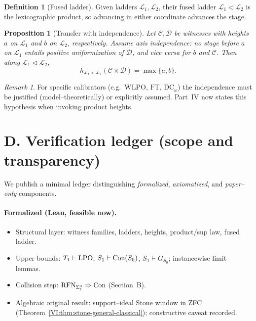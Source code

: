 \documentclass[11pt]{article}
\newtheorem{proposition}[theorem]{Proposition}
\theoremstyle{definition}
\newtheorem{definition}[theorem]{Definition}
\theoremstyle{remark}
\newtheorem{remark}[theorem]{Remark}
\newcommand{\WLPO}{\mathrm{WLPO}}
\newcommand{\DCw}{\mathrm{DC}_\omega}
\newcommand{\FT}{\mathrm{FT}}
\begin{document}
\begin{definition}[Fused ladder]
Given ladders $\mathcal L_1,\mathcal L_2$, their fused ladder $\mathcal L_1\triangleleft\mathcal L_2$ is the lexicographic product, so advancing in either coordinate advances the stage.
\end{definition}

\begin{proposition}[Transfer with independence]\label{VI:prop:transfer-indep}
Let $\mathcal C,\mathcal D$ be witnesses with heights $a$ on $\mathcal L_1$ and $b$ on $\mathcal L_2$, respectively. Assume \emph{axis independence}: no stage before $a$ on $\mathcal L_1$ entails positive uniformization of $\mathcal D$, and vice versa for $b$ and $\mathcal C$. Then along $\mathcal L_1\triangleleft\mathcal L_2$,
\[
h_{\mathcal L_1\triangleleft\mathcal L_2}(\mathcal C\times \mathcal D)=\max\{a,b\}.
\]
\end{proposition}

\begin{remark}
For specific calibrators (e.g.\ $\WLPO$, $\FT$, $\DCw$) the independence must be justified (model–theoretically) or explicitly assumed. Part~IV now states this hypothesis when invoking product heights.
\end{remark}

\section{D. Verification ledger (scope and transparency)}

We publish a minimal ledger distinguishing \emph{formalized}, \emph{axiomatized}, and \emph{paper–only} components.

\paragraph{Formalized (Lean, feasible now).}
\begin{itemize}
\item Structural layer: witness families, ladders, heights, product/sup law, fused ladder.
\item Upper bounds: $T_1\vdash\mathrm{LPO}$, $S_1\vdash\mathrm{Con}(S_0)$, $S_1\vdash G_{S_0}$; instancewise limit lemmas.
\item Collision step: \(\mathrm{RFN}_{\Sigma^0_1}\Rightarrow \mathrm{Con}\) (Section~B).
\item Algebraic original result: support–ideal Stone window in ZFC (Theorem~\ref{VI:thm:stone-general-classical}); constructive caveat recorded.
\end{itemize}
\end{document}
